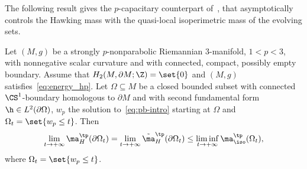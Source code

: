 The following result gives the $p$-capacitary counterpart of~\cite[Lemma 2.7]{benatti_isoperimetricriemannianpenroseinequality_2022}, that asymptotically controls the Hawking mass with the quasi-local isoperimetric mass of the evolving sets.

\begin{Lemma}\label{thm:mass_control_pcap}
Let $(M,g)$ be a strongly $p$-nonparabolic Riemannian $3$-manifold, $1<p<3$, with nonnegative scalar curvature and with connected, compact, possibly empty boundary. Assume that $H_2( M, \partial M; \Z)=\set{0}$ and $(M,g)$ satisfies~\eqref{eq:energy_hp}. Let $\Omega\subseteq M$ be a closed bounded subset with connected $\CS^1$-boundary homologous to $\partial M$ and with second fundamental form $\h \in L^2(\partial \Omega)$, $w_p$ the solution to~\eqref{eq:pb-intro} starting at $\Omega$ and $\Omega_t= \set{w_p \leq t}$. Then
\begin{equation}\label{eq:mass_contro_pcap}
 \lim_{t \to +\infty} \ma_{H}^{\tp}(\partial \Omega_t)= \lim_{t \to +\infty} \tilde{\ma}_{H}^{\tp}(\partial \Omega_t) \leq\liminf_{t \to +\infty} \ma_{\iso}^{\tp}(\Omega_t),
\end{equation}
where $\Omega_t= \set{ w_p \leq t}$.
\end{Lemma}

